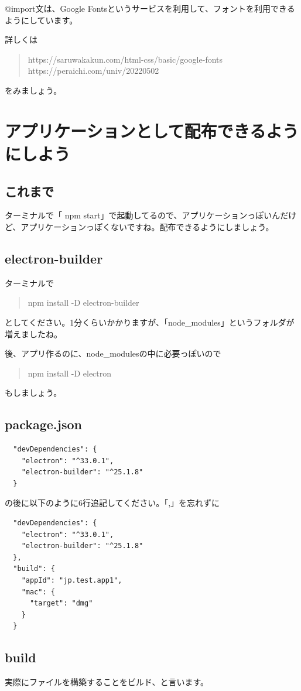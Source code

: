 \documentclass[mingoth,11pt,a4j,uplatex]{jsarticle}
\begin{document}
@import文は、Google Fontsというサービスを利用して、フォントを利用できるようにしています。

詳しくは
\begin{quote}
https://saruwakakun.com/html-css/basic/google-fonts
https://peraichi.com/univ/20220502
\end{quote}
をみましょう。

\section{アプリケーションとして配布できるようにしよう}
\subsection{これまで}
ターミナルで「 npm start」で起動してるので、アプリケーションっぽいんだけど、アプリケーションっぽくないですね。配布できるようにしましょう。

\subsection{electron-builder}
ターミナルで
\begin{quote}
npm install -D electron-builder
\end{quote}
としてください。1分くらいかかりますが、「node\_modules」というフォルダが増えましたね。

後、アプリ作るのに、node\_modulesの中に必要っぽいので
\begin{quote}
npm install -D electron
\end{quote}
もしましょう。

\subsection{package.json}
\begin{verbatim}
  "devDependencies": {
    "electron": "^33.0.1",
    "electron-builder": "^25.1.8"
  }
\end{verbatim}
の後に以下のように6行追記してください。「,」を忘れずに
\begin{verbatim}
  "devDependencies": {
    "electron": "^33.0.1",
    "electron-builder": "^25.1.8"
  },
  "build": {
    "appId": "jp.test.app1",
    "mac": {
      "target": "dmg"
    }
  }
\end{verbatim}

\subsection{build}
実際にファイルを構築することをビルド、と言います。
\end{document}
